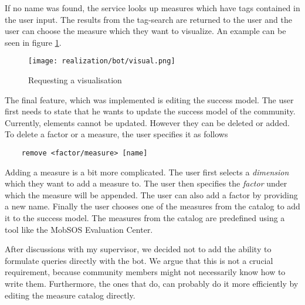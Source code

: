 If no name was found, the service looks up measures which have tags contained in the user input. The results from the tag-search are returned to the user and the user can choose the measure which they want to visualize.
An example can be seen in figure \ref{fig:visualReq}.
\begin{figure}[h]
    \centering
    \texttt{[image: realization/bot/visual.png]}
    \caption{Requesting a visualisation}
    \label{fig:visualReq}
\end{figure}


The final feature, which was implemented is editing the success model. The user first needs to state that he wants to update the success model of the community.
Currently, elements cannot be updated. 
However they can be deleted or added. 
To delete a factor or a measure, the user specifies it as follows \begin{lstlisting}
    remove <factor/measure> [name]
\end{lstlisting}  
Adding a measure is a bit more complicated. The user first selects a \emph{dimension} which they want to add a measure to. The user then specifies the \emph{factor} under which the measure will be appended. The user can also add a factor by providing a new name. Finally the user chooses one of the measures from the catalog to add it to the success model. 
The measures from the catalog are predefined using a tool like the MobSOS Evaluation Center. 

After discussions with my supervisor, we decided not to add the ability to formulate queries directly with the bot. 
We argue that this is not a crucial requirement, because community members might not necessarily know how to write them. Furthermore, the ones that do, can probably do it more efficiently by editing the measure catalog directly.




